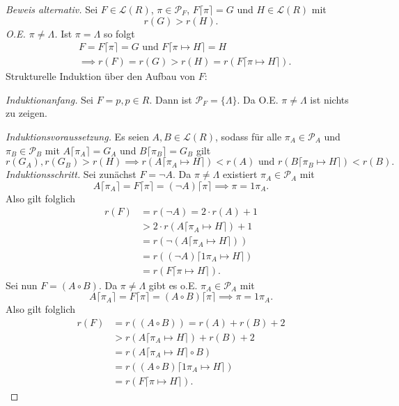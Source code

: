 \begin{proof}[Beweis alternativ]
	Sei $F \in \mathcal{L}(R)$, $\pi \in \mathcal{P}_F$, $F\lceil\pi\rceil = G$ und $H \in \mathcal{L}(R)$ mit
	$$ r(G) > r(H).$$
	\emph{O.E. $\pi \ne \Lambda$.} Ist $\pi = \Lambda$ so folgt
	\begin{align*}
		& F = F \lceil \pi \rceil = G \text{ und } F\lceil\pi \mapsto H\rceil = H\\
		& \implies r(F) = r(G) > r(H) = r(F\lceil\pi \mapsto H\rceil).
	\end{align*}
	Strukturelle Induktion über den Aufbau von $F$:

	\emph{Induktionanfang.} Sei $F = p, p \in R$. Dann ist $\mathcal{P}_F = \{\Lambda\}$. Da O.E. $\pi \ne \Lambda$ ist nichts zu zeigen.

	\emph{Induktionsvoraussetzung.} Es seien $A,B \in \mathcal{L}(R)$, sodass
	für alle $\pi_A \in \mathcal{P}_A$ und $\pi_B \in \mathcal{P}_B$ mit 
	$A\lceil\pi_A\rceil = G_A$ und $B\lceil\pi_B\rceil = G_B$ gilt
	$$ r(G_A),r(G_B) > r(H) \implies r(A\lceil \pi_A \mapsto H\rceil) < r(A) \text{ und } r(B\lceil \pi_B \mapsto H\rceil) < r(B).$$
	\emph{Induktionsschritt.} Sei zunächst $F = \neg A$. Da $\pi \ne \Lambda$ existiert $\pi_A \in \mathcal{P}_A$ mit
	$$ A\lceil\pi_A\rceil = F\lceil\pi\rceil = (\neg A)\lceil\pi\rceil \implies \pi = 1\pi_A. $$
	Also gilt folglich
	\begin{align*}
		r(F) &= r(\neg A) = 2 \cdot r(A) + 1\\
			& > 2 \cdot r(A\lceil \pi_A \mapsto H\rceil) + 1\\
			& = r(\neg (A\lceil \pi_A \mapsto H\rceil))\\
			& = r((\neg A)\lceil 1\pi_A \mapsto H\rceil)\\
			& = r(F\lceil\pi \mapsto H\rceil).
	\end{align*}
	Sei nun $F = (A \circ B)$. Da $\pi \ne \Lambda$ gibt es o.E. $\pi_A \in \mathcal{P}_A$ mit
	$$ A\lceil\pi_A\rceil = F\lceil\pi\rceil = (A \circ B)\lceil\pi\rceil \implies \pi = 1\pi_A. $$
	Also gilt folglich
	\begin{align*}
		r(F) &= r((A\circ B)) = r(A) + r(B) + 2\\
			& > r(A\lceil \pi_A \mapsto H\rceil) + r(B) + 2\\
			& = r(A\lceil \pi_A \mapsto H\rceil \circ B)\\
			& = r((A \circ B)\lceil 1\pi_A \mapsto H\rceil)\\
			& = r(F\lceil \pi \mapsto H \rceil).
	\end{align*}
\end{proof}

